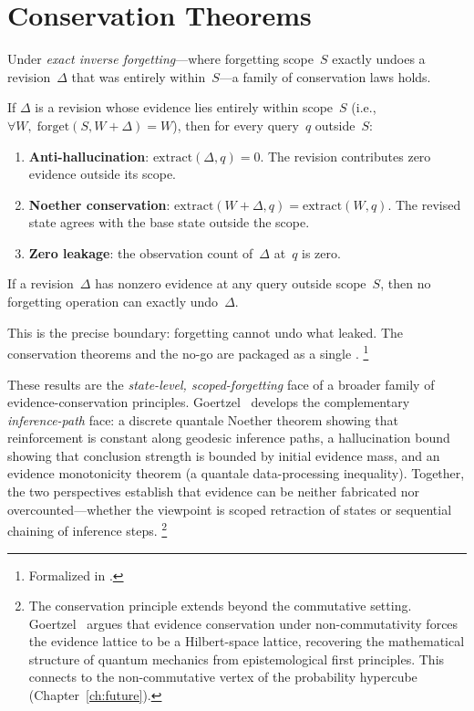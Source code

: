 \documentclass[11pt,openany]{report}
\begin{document}
\section{Conservation Theorems}

Under \emph{exact inverse forgetting}---where forgetting scope~$S$
exactly undoes a revision~$\Delta$ that was entirely within~$S$---a
family of conservation laws holds.

\begin{theorem}
\label{thm:conservation}
If $\Delta$ is a revision whose evidence lies entirely within scope~$S$
(i.e., $\forall W,\; \mathrm{forget}(S, W + \Delta) = W$), then for
every query~$q$ outside~$S$:
\begin{enumerate}
\item \textbf{Anti-hallucination}: $\mathrm{extract}(\Delta, q) = 0$.
  The revision contributes zero evidence outside its scope.
\item \textbf{Noether conservation}:
  $\mathrm{extract}(W + \Delta, q) = \mathrm{extract}(W, q)$.
  The revised state agrees with the base state outside the scope.
\item \textbf{Zero leakage}: the observation count of~$\Delta$ at~$q$
  is zero.
\end{enumerate}
\end{theorem}

\begin{theorem}
If a revision~$\Delta$ has nonzero evidence at any query outside
scope~$S$, then no forgetting operation can exactly undo~$\Delta$.
\end{theorem}

\noindent
This is the precise boundary: forgetting cannot undo what leaked.
The conservation theorems and the no-go are packaged as a single
.%
\footnote{Formalized in
.}

These results are the \emph{state-level, scoped-forgetting} face of
a broader family of evidence-conservation principles.
Goertzel~\cite{GoertzelEvidenceConservation2026} develops the
complementary \emph{inference-path} face: a discrete quantale Noether
theorem showing that reinforcement is constant along geodesic
inference paths, a hallucination bound showing that conclusion
strength is bounded by initial evidence mass, and an evidence
monotonicity theorem (a quantale data-processing inequality).
Together, the two perspectives establish that evidence can be neither
fabricated nor overcounted---whether the viewpoint is scoped
retraction of states or sequential chaining of inference steps.%
\footnote{The conservation principle extends beyond the commutative
setting.  Goertzel~\cite{GoertzelQMEvidence2026} argues that
evidence conservation under non-commutativity forces the evidence
lattice to be a Hilbert-space lattice, recovering the mathematical
structure of quantum mechanics from epistemological first principles.
This connects to the non-commutative vertex of the probability
hypercube (Chapter~\ref{ch:future}).}
\end{document}
